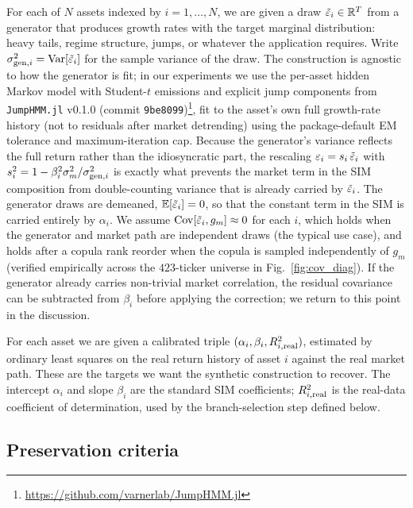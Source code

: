 For each of $N$ assets indexed by $i = 1,\dots,N$, we are given a draw
$\tilde{\varepsilon}_i \in \mathbb{R}^T$ from a generator that produces growth rates with
the target marginal distribution: heavy tails, regime structure,
jumps, or whatever the application requires. Write
$\sigma_{\mathrm{gen},i}^2 = \operatorname{Var}[\tilde{\varepsilon}_i]$ for the sample variance of the
draw. The construction is agnostic to how the generator is fit; in our
experiments we use the per-asset hidden Markov model with Student-$t$
emissions and explicit jump components from
\texttt{JumpHMM.jl} v0.1.0 (commit
\texttt{9be8099})\footnote{\url{https://github.com/varnerlab/JumpHMM.jl}},
fit to the asset's own full growth-rate history (not to residuals
after market detrending) using the package-default EM tolerance
and maximum-iteration cap. Because the generator's variance reflects
the full return rather than the idiosyncratic part, the rescaling
$\varepsilon_i = s_i\,\tilde{\varepsilon}_i$ with
$s_i^2 = 1 - \beta_i^2 \sigma_m^2 / \sigma_{\mathrm{gen},i}^2$ is exactly what
prevents the market term in the SIM composition from double-counting
variance that is already carried by $\tilde{\varepsilon}_i$. The generator draws
are demeaned, $\mathbb{E}[\tilde{\varepsilon}_i] = 0$, so that the constant term in the SIM
is carried entirely by $\alpha_i$.
We assume $\operatorname{Cov}[\tilde{\varepsilon}_i, g_m] \approx 0$ for each $i$, which holds
when the generator and market path are independent draws (the typical
use case), and holds after a copula rank reorder when the copula is
sampled independently of $g_m$ (verified empirically across the
$423$-ticker universe in Fig.~\ref{fig:cov_diag}). If the generator
already carries non-trivial market correlation, the residual
covariance can be subtracted from $\beta_i$ before applying the
correction; we return to this point in the discussion.

For each asset we are given a calibrated triple
$(\alpha_i, \beta_i, R^2_{i,\mathrm{real}})$, estimated by ordinary least
squares on the real return history of asset $i$ against the real
market path. These are the targets we want the synthetic construction
to recover. The intercept $\alpha_i$ and slope $\beta_i$ are the
standard SIM coefficients; $R^2_{i,\mathrm{real}}$ is the real-data
coefficient of determination, used by the branch-selection step
defined below.

\subsection{Preservation criteria}
\label{sec:method-criteria}

